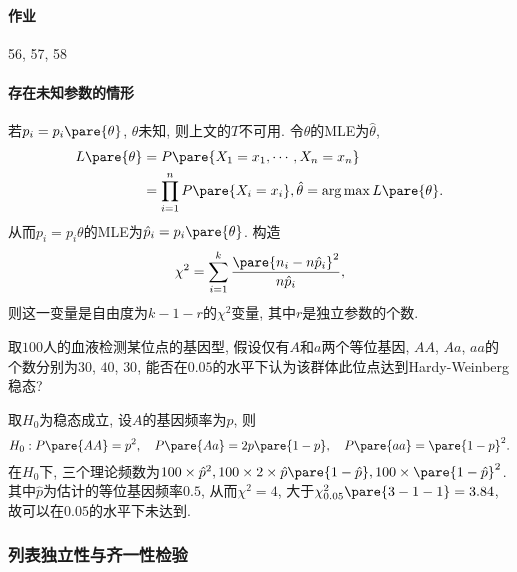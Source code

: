 \documentclass[../Statistics.tex]{subfiles}
\begin{document}
\paragraph{作业} %
\label{par:作业}

56, 57, 58


\paragraph{存在未知参数的情形} %
\label{par:存在未知参数的情形}

若$p_i = p_i\pare{\theta}$, $\theta$未知, 则上文的$T$不可用. 令$\theta$的MLE为$\hat\theta$,
\begin{align*}
    L\pare{\theta} &= P\pare{X_1 = x_1,\cdots,X_n = x_n} \\
    &= \prod_{i=1}^n P\pare{X_i = x_i},
    \hat\theta = \arg\max L\pare{\theta}.
\end{align*}
从而$p_i = p_i\theta$的MLE为$\hat{p}_i = p_i\pare{\theta}$. 构造
\[ \chi^2 = \sum_{i=1}^k \frac{\pare{n_i - n\hat{p}_i}^2}{n\hat{p}_i}, \]
则这一变量是自由度为$k-1-r$的$\chi^2$变量, 其中$r$是独立参数的个数.


\begin{sample}
    \begin{ex}
        取$100$人的血液检测某位点的基因型, 假设仅有$A$和$a$两个等位基因, $AA$, $Aa$, $aa$的个数分别为$30$, $40$, $30$, 能否在$0.05$的水平下认为该群体此位点达到Hardy-Weinberg稳态?
    \end{ex}
    \begin{solution}
        取$H_0$为稳态成立, 设$A$的基因频率为$p$, 则
        \[ H_0: P\pare{AA} = p^2,\quad P\pare{Aa} = 2p\pare{1-p},\quad P\pare{aa} = \pare{1-p}^2. \]
        在$H_0$下, 三个理论频数为$100\times\hat p^2, 100\times 2\times \hat p\pare{1-\hat p}, 100\times\pare{1-\hat p}^2$. 其中$\hat p$为估计的等位基因频率$0.5$, 从而$\chi^2 = 4$, 大于$\chi^2_{0.05}\pare{3-1-1} = 3.84$, 故可以在$0.05$的水平下未达到.
    \end{solution}
\end{sample}


\subsubsection{列表独立性与齐一性检验} %
\label{ssub:列表独立性与齐一性检验}
\end{document}
